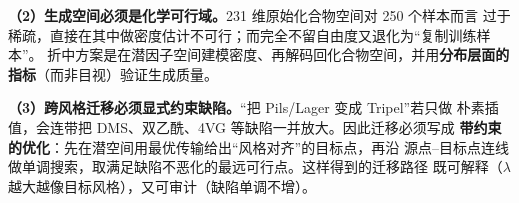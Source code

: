 \textbf{（2）生成空间必须是化学可行域。}231 维原始化合物空间对 250 个样本而言
过于稀疏，直接在其中做密度估计不可行；而完全不留自由度又退化为“复制训练样本”。
折中方案是在潜因子空间建模密度、再解码回化合物空间，并用\textbf{分布层面的
指标}（而非目视）验证生成质量。

\textbf{（3）跨风格迁移必须显式约束缺陷。}“把 Pils/Lager 变成 Tripel”若只做
朴素插值，会连带把 DMS、双乙酰、4VG 等缺陷一并放大。因此迁移必须写成
\textbf{带约束的优化}：先在潜空间用最优传输给出“风格对齐”的目标点，再沿
源点--目标点连线做单调搜索，取满足缺陷不恶化的最远可行点。这样得到的迁移路径
既可解释（$\lambda$ 越大越像目标风格），又可审计（缺陷单调不增）。
